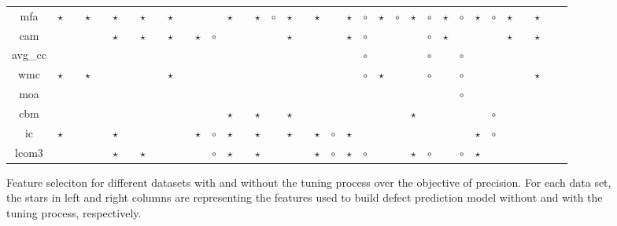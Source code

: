 \documentclass{sig-alternative}
\begin{document}
\begin{figure}[!ht]
\begin{tabular}{c|c c|c c|c c|c c|c c|c c|c c|c c|c c|c c|c c|c c|c c|c c|c c|c c|c c|c }
mfa& $\star$& & $\star$& & $\star$& & $\star$& & $\star$& & & & $\star$& & $\star$& $\circ$& $\star$& & $\star$& & $\star$& $\circ$& $\star$& $\circ$& $\star$& $\circ$& $\star$& $\circ$& $\star$& $\circ$& $\star$& & $\star$& \\
cam& & & & & $\star$& & $\star$& & $\star$& & $\star$& $\circ$& & & & & $\star$& & & & $\star$& $\circ$& & & & $\circ$& $\star$& & & & $\star$& & $\star$& \\
avg\_cc& & & & & & & & & & & & & & & & & & & & & & $\circ$& & & & $\circ$& & $\circ$& & & & & & \\
wmc& $\star$& & $\star$& & & & & & $\star$& & & & & & & & & & & & & $\circ$& $\star$& & & $\circ$& & $\circ$& & & & & $\star$& \\
moa& & & & & & & & & & & & & & & & & & & & & & & & & & & & $\circ$& & & & & & \\
cbm& & & & & & & & & & & & & $\star$& & $\star$& & $\star$& & & & & & & & $\star$& & & & & $\circ$& & & & \\
ic& $\star$& & & & $\star$& & & & & & $\star$& $\circ$& $\star$& & $\star$& & $\star$& & $\star$& $\circ$& $\star$& & & & & & & & $\star$& $\circ$& & & & \\
lcom3& & & & & $\star$& & $\star$& & & & & $\circ$& $\star$& & $\star$& & & & $\star$& $\circ$& $\star$& $\circ$& & & $\star$& $\circ$& & $\circ$& $\star$& & & & & \\

  \end{tabular}
  \caption{Feature seleciton for different datasets with and without the tuning process over the objective of precision. For each data set, the stars in left and right columns are representing the features used to build defect prediction model without and with the tuning process, respectively.}
\end{figure}

\end{document}
